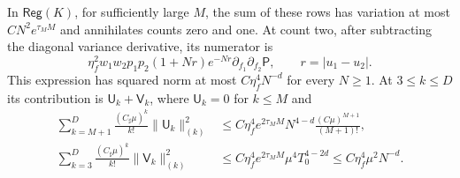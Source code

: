 \begin{lemma}\label{lem:new-pair}
In $\mathsf{Reg}(K)$, for sufficiently large $M$, the sum of these rows
has variation at most $CN^2e^{\tau_MM}$ and annihilates counts zero
and one. At count two, after subtracting the diagonal variance
derivative, its numerator is
\begin{equation}\label{eq:new-pair-defect}
 \eta_f^2w_1w_2p_1p_2(1+Nr)e^{-Nr}
 \partial_{f_1}\partial_{f_2}\mathsf P,
 \qquad r=|u_1-u_2|.
\end{equation}
This expression has squared norm at most $C\eta_f^4N^{-d}$ for every
$N\ge1$. At $3\le k\le D$ its contribution is
$\mathsf U_k+\mathsf V_k$, where $\mathsf U_k=0$ for $k\le M$ and
\begin{align}
 \sum_{k=M+1}^D\frac{(C_\sharp\mu)^k}{k!}\|\mathsf U_k\|_{(k)}^2
 &\le C\eta_f^4e^{2\tau_MM}N^{4-d}
       \frac{(C\mu)^{M+1}}{(M+1)!},\label{eq:new-pair-alias}\\
 \sum_{k=3}^D\frac{(C_\sharp\mu)^k}{k!}\|\mathsf V_k\|_{(k)}^2
 &\le C\eta_f^4e^{2\tau_MM}\mu^4T_0^{4-2d}
 \le C\eta_f^4\mu^2N^{-d}.\label{eq:new-pair-field}
\end{align}
\end{lemma}

